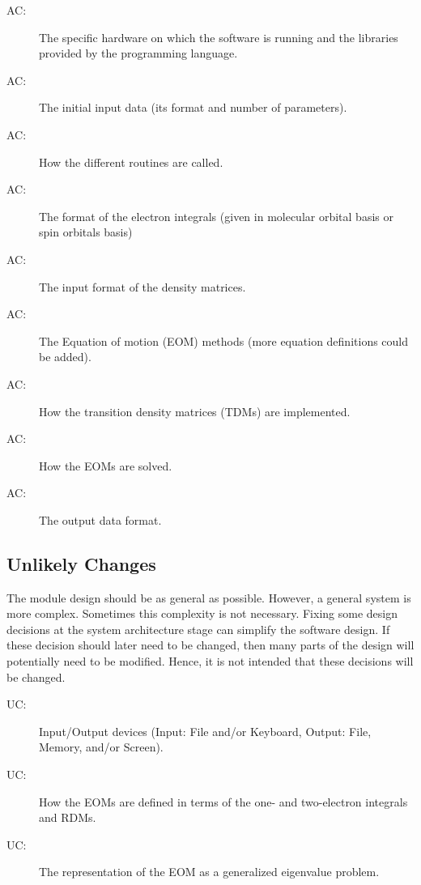 \documentclass[12pt, titlepage]{article}
\newcounter{acnum}
\newcommand{\actheacnum}{AC\theacnum}
\newcounter{ucnum}
\newcommand{\uctheucnum}{UC\theucnum}
\begin{document}
\begin{description}
\item[ \actheacnum \label{acHardware}:] The specific
  hardware on which the software is running and the libraries 
  provided by the programming language.
\item[ \actheacnum \label{acInput}:] The
initial input data (its format and number of parameters).
\item[ \actheacnum \label{acDriver}:] How the different 
routines are called.
\item[ \actheacnum \label{acIntegrals}:] The format of 
the electron integrals (given in molecular orbital basis or spin orbitals basis)
\item[ \actheacnum \label{acRDMs}:] The input format of 
the density matrices.
\item[ \actheacnum \label{acEOMs}:] The Equation of 
motion (EOM) methods (more equation definitions could be added).
\item[ \actheacnum \label{acTDMs}:] How the transition 
density matrices (TDMs) are implemented.
\item[ \actheacnum \label{acSolver}:] How the EOMs are 
solved.
\item[ \actheacnum \label{acOutput}:] The output data 
format.
\end{description}

\subsection{Unlikely Changes} \label{SecUchange}

The module design should be as general as possible. However, a general system is
more complex. Sometimes this complexity is not necessary. Fixing some design
decisions at the system architecture stage can simplify the software design. If
these decision should later need to be changed, then many parts of the design
will potentially need to be modified. Hence, it is not intended that these
decisions will be changed.

\begin{description}
\item[ \uctheucnum \label{ucIO}:] Input/Output devices
  (Input: File and/or Keyboard, Output: File, Memory, and/or Screen).
\item[ \uctheucnum \label{ucRDMs}:] How the EOMs are 
defined in terms of the one- and two-electron integrals and RDMs.
\item[ \uctheucnum \label{ucGenEigval}:] The 
representation of the EOM as a generalized eigenvalue problem.
\end{description}
\end{document}
